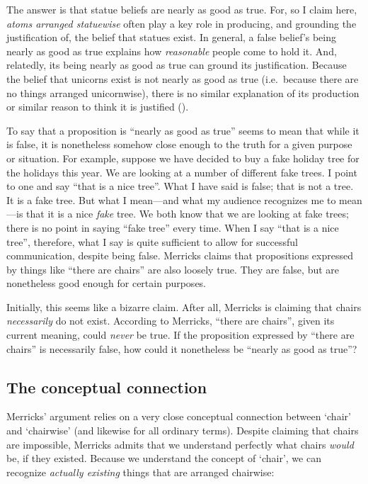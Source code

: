 \documentclass[11pt]{article}
\newenvironment{squote}{%
\begin{spacing}{1}
       	\begin{list}{}{%
\setlength{\labelwidth}{0pt}%
\rightmargin\leftmargin%
}
\item\relax
}{%
\end{list}%
\end{spacing}
}
\begin{document}
\begin{spacing}{1.25}
\begin{squote}
The answer is that statue beliefs are nearly as good as true.  For, so
I claim here, {\em atoms arranged statuewise} often play a key role in
producing, and grounding the justification of, the belief that statues
exist.  In general, a false belief's being nearly as good as true
explains how {\em reasonable} people come to hold it.  And, relatedly,
its being nearly as good as true can ground its justification.
Because the belief that unicorns exist is not nearly as good as true
(i.e.\ because there are no things arranged unicornwise), there is no
similar explanation of its production or similar reason to think it is
justified (\citeyear[171--172]{merricks2001a}).
\end{squote}

To say that a proposition is ``nearly as good as true'' seems to mean
that while it is false, it is nonetheless somehow close enough to the
truth for a given purpose or situation.  For example, suppose we have
decided to buy a fake holiday tree for the holidays this year.  We are
looking at a number of different fake trees.  I point to one and say
``that is a nice tree''.  What I have said is false; that is not a
tree.  It is a fake tree.  But what I mean---and what my audience
recognizes me to mean---is that it is a nice {\em fake} tree.  We both
know that we are looking at fake trees; there is no point in saying
``fake tree'' every time.  When I say ``that is a nice tree'',
therefore, what I say is quite sufficient to allow for successful
communication, despite being false.  Merricks claims that propositions
expressed by things like ``there are chairs'' are also loosely true.
They are false, but are nonetheless good enough for certain purposes.

Initially, this seems like a bizarre claim.  After all, Merricks is
claiming that chairs {\em necessarily} do not exist.  According to
Merricks, ``there are chairs'', given its current meaning, could {\em
  never} be true.  If the proposition expressed by ``there are
chairs'' is necessarily false, how could it nonetheless be ``nearly as
good as true''?

\subsection{The conceptual connection}
\label{connection}
Merricks' argument relies on a very close conceptual connection
between `chair' and `chairwise' (and likewise for all ordinary terms).
Despite claiming that chairs are impossible, Merricks admits that we
understand perfectly what chairs {\em would} be, if they existed.
Because we understand the concept of `chair', we can recognize {\em
  actually existing} things that are arranged chairwise:


\end{spacing}
\end{document}

